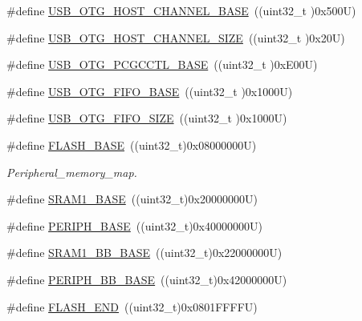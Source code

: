 \begin{DoxyCompactItemize}
\item 
\#define \hyperlink{group___peripheral__registers__structures_ga942c8c5241b80fbcf638fea0fa18bebd}{U\+S\+B\+\_\+\+O\+T\+G\+\_\+\+H\+O\+S\+T\+\_\+\+C\+H\+A\+N\+N\+E\+L\+\_\+\+B\+A\+SE}~((uint32\+\_\+t )0x500\+U)
\item 
\#define \hyperlink{group___peripheral__registers__structures_ga266cb1dbb50faf447f9c15d2ee93a522}{U\+S\+B\+\_\+\+O\+T\+G\+\_\+\+H\+O\+S\+T\+\_\+\+C\+H\+A\+N\+N\+E\+L\+\_\+\+S\+I\+ZE}~((uint32\+\_\+t )0x20\+U)
\item 
\#define \hyperlink{group___peripheral__registers__structures_gaa9766975aca084c257730879568bc7cf}{U\+S\+B\+\_\+\+O\+T\+G\+\_\+\+P\+C\+G\+C\+C\+T\+L\+\_\+\+B\+A\+SE}~((uint32\+\_\+t )0x\+E00\+U)
\item 
\#define \hyperlink{group___peripheral__registers__structures_gace340350802904868673f0e839c4fa04}{U\+S\+B\+\_\+\+O\+T\+G\+\_\+\+F\+I\+F\+O\+\_\+\+B\+A\+SE}~((uint32\+\_\+t )0x1000\+U)
\item 
\#define \hyperlink{group___peripheral__registers__structures_ga8781c4b2406c740d9fe540737a6a0188}{U\+S\+B\+\_\+\+O\+T\+G\+\_\+\+F\+I\+F\+O\+\_\+\+S\+I\+ZE}~((uint32\+\_\+t )0x1000\+U)
\item 
\#define \hyperlink{group___peripheral__registers__structures_ga23a9099a5f8fc9c6e253c0eecb2be8db}{F\+L\+A\+S\+H\+\_\+\+B\+A\+SE}~((uint32\+\_\+t)0x08000000\+U)
\begin{DoxyCompactList}\small\item\em Peripheral\+\_\+memory\+\_\+map. \end{DoxyCompactList}\item 
\#define \hyperlink{group___peripheral__registers__structures_ga7d0fbfb8894012dbbb96754b95e562cd}{S\+R\+A\+M1\+\_\+\+B\+A\+SE}~((uint32\+\_\+t)0x20000000\+U)
\item 
\#define \hyperlink{group___peripheral__registers__structures_ga9171f49478fa86d932f89e78e73b88b0}{P\+E\+R\+I\+P\+H\+\_\+\+B\+A\+SE}~((uint32\+\_\+t)0x40000000\+U)
\item 
\#define \hyperlink{group___peripheral__registers__structures_gac4c4f61082e4b168f29d9cf97dc3ca5c}{S\+R\+A\+M1\+\_\+\+B\+B\+\_\+\+B\+A\+SE}~((uint32\+\_\+t)0x22000000\+U)
\item 
\#define \hyperlink{group___peripheral__registers__structures_gaed7efc100877000845c236ccdc9e144a}{P\+E\+R\+I\+P\+H\+\_\+\+B\+B\+\_\+\+B\+A\+SE}~((uint32\+\_\+t)0x42000000\+U)
\item 
\#define \hyperlink{group___peripheral__registers__structures_ga8be554f354e5aa65370f6db63d4f3ee4}{F\+L\+A\+S\+H\+\_\+\+E\+ND}~((uint32\+\_\+t)0x0801\+F\+F\+F\+F\+U)

\end{DoxyCompactItemize}
